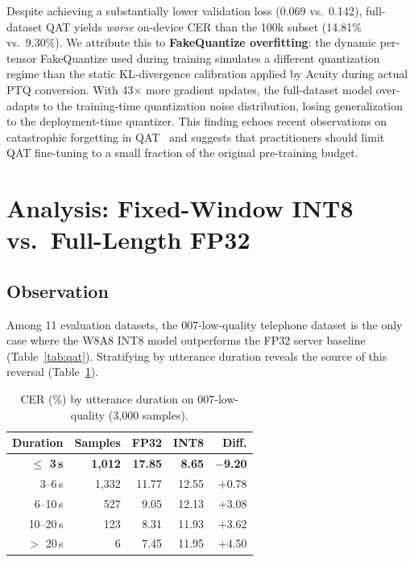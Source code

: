 \documentclass[a4paper,11pt,twocolumn]{article}
\begin{document}
Despite achieving a substantially lower validation loss (0.069 vs.\ 0.142), full-dataset QAT yields \textit{worse} on-device CER than the 100k subset (14.81\% vs.\ 9.30\%). We attribute this to \textbf{FakeQuantize overfitting}: the dynamic per-tensor FakeQuantize used during training simulates a different quantization regime than the static KL-divergence calibration applied by Acuity during actual PTQ conversion. With 43$\times$ more gradient updates, the full-dataset model over-adapts to the training-time quantization noise distribution, losing generalization to the deployment-time quantizer. This finding echoes recent observations on catastrophic forgetting in QAT~\cite{chen2023iccv} and suggests that practitioners should limit QAT fine-tuning to a small fraction of the original pre-training budget.

\section{Analysis: Fixed-Window INT8 vs.\ Full-Length FP32}
\label{sec:analysis}

\subsection{Observation}

Among 11 evaluation datasets, the 007-low-quality telephone dataset is the only case where the W8A8 INT8 model outperforms the FP32 server baseline (Table~\ref{tab:qat}). Stratifying by utterance duration reveals the source of this reversal (Table~\ref{tab:duration}).

\begin{table}[t]
\centering
\caption{CER (\%) by utterance duration on 007-low-quality (3,000 samples).}
\label{tab:duration}
\small
\begin{tabular}{@{}rrrrr@{}}
\toprule
Duration & Samples & FP32 & INT8 & Diff. \\
\midrule
\textbf{$\leq$ 3\,s} & \textbf{1,012} & \textbf{17.85} & \textbf{8.65} & \textbf{$-$9.20} \\
3--6\,s & 1,332 & 11.77 & 12.55 & +0.78 \\
6--10\,s & 527 & 9.05 & 12.13 & +3.08 \\
10--20\,s & 123 & 8.31 & 11.93 & +3.62 \\
$>$ 20\,s & 6 & 7.45 & 11.95 & +4.50 \\
\bottomrule
\end{tabular}
\end{table}
\end{document}
